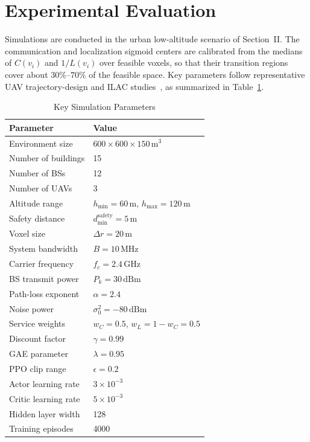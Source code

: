 \documentclass[10pt,journal,letterpaper]{IEEEtran}
\begin{document}
\section{Experimental Evaluation}

Simulations are conducted in the urban low-altitude scenario of Section~II. The communication and localization sigmoid centers are calibrated from the medians of $C(v_i)$ and $1/L(v_i)$ over feasible voxels, so that their transition regions cover about $30\%$--$70\%$ of the feasible space. Key parameters follow representative UAV trajectory-design and ILAC studies~\cite{ref8,ref14}, as summarized in Table~\ref{tab:params}.

\begin{table}[!t]
\centering
\caption{Key Simulation Parameters}
\label{tab:params}
\begin{tabular}{ll}
\hline
\textbf{Parameter} & \textbf{Value} \\
\hline
Environment size & $600\times600\times150\,\mathrm{m}^3$ \\
Number of buildings & 15 \\
Number of BSs & 12 \\
Number of UAVs & 3 \\
Altitude range & $h_{\min}=60\,\mathrm{m}$, $h_{\max}=120\,\mathrm{m}$ \\
Safety distance & $d_{\min}^{\mathrm{safety}}=5\,\mathrm{m}$ \\
Voxel size & $\Delta r=20\,\mathrm{m}$ \\
System bandwidth & $B=10\,\mathrm{MHz}$ \\
Carrier frequency & $f_c=2.4\,\mathrm{GHz}$ \\
BS transmit power & $P_k=30\,\mathrm{dBm}$ \\
Path-loss exponent & $\alpha=2.4$ \\
Noise power & $\sigma_0^2=-80\,\mathrm{dBm}$ \\
Service weights & $w_C=0.5$, $w_L=1-w_C=0.5$ \\
Discount factor & $\gamma=0.99$ \\
GAE parameter & $\lambda=0.95$ \\
PPO clip range & $\epsilon=0.2$ \\
Actor learning rate & $3\times10^{-3}$ \\
Critic learning rate & $5\times10^{-3}$ \\
Hidden layer width & 128 \\
Training episodes & 4000 \\ 
\hline
\end{tabular}
\end{table}
\end{document}
